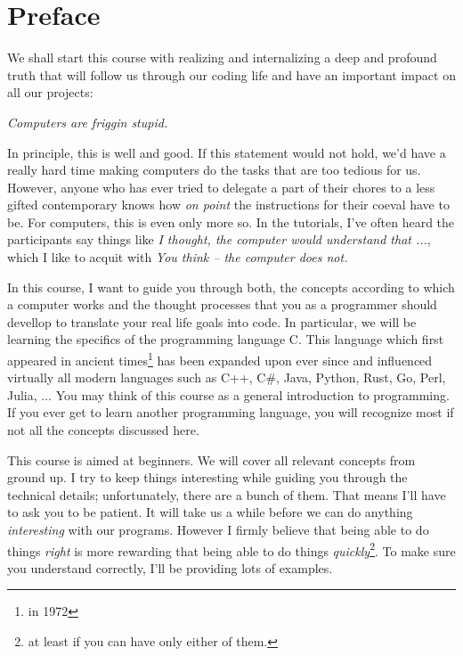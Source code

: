 \chapter*{Preface}
We shall start this course with realizing and internalizing a deep and profound truth that will follow us through our coding life and have an important impact on all our projects:

\begin{defbox}
\begin{center}
\begin{Huge}
	\emph{Computers are friggin stupid.}
\end{Huge}
\end{center}
\end{defbox}

In principle, this is well and good. If this statement would not hold, we'd have a really hard time making computers do the tasks that are too tedious for us. However, anyone who has ever tried to delegate a part of their chores to a less gifted contemporary knows how \emph{on point} the instructions for their coeval have to be. For computers, this is even only more so. In the tutorials, I've often heard the participants say things like \emph{I thought, the computer would understand that ...}, which I like to acquit with \emph{You think -- the computer does not.}

In this course, I want to guide you through both, the concepts according to which a computer works and the thought processes that you as a programmer should devellop to translate your real life goals into code. In particular, we will be learning the specifics of the programming language C. This language which first appeared in ancient times\footnote{\ie in 1972} has been expanded upon ever since and influenced virtually all modern languages such as C++, C\#, Java, Python, Rust, Go, Perl, Julia, ... You may think of this course as a general introduction to programming. If you ever get to learn another programming language, you will recognize most if not all the concepts discussed here.

This course is aimed at beginners. We will cover all relevant concepts from ground up. I try to keep things interesting while guiding you through the technical details; unfortunately, there are a bunch of them. That means I'll have to ask you to be patient. It will take us a while before we can do anything \emph{interesting} with our programs. However I firmly believe that being able to do things \emph{right} is more rewarding that being able to do things \emph{quickly}\footnote{at least if you can have only either of them.}. To make sure you understand correctly, I'll be providing lots of examples.


